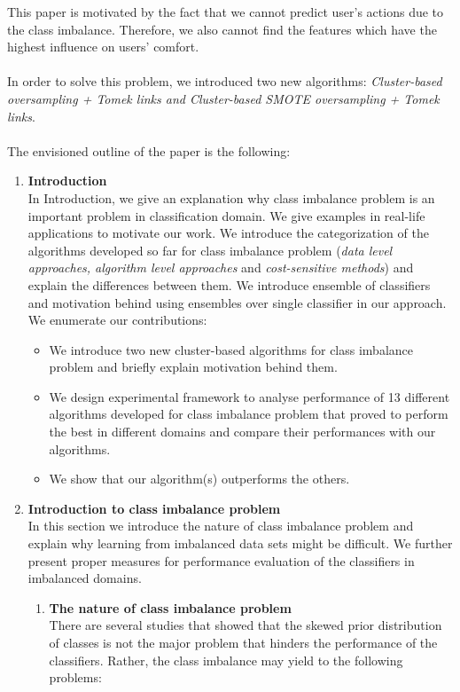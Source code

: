 \documentclass[a4paper]{article}
\begin{document}
This paper is motivated by the fact that we cannot predict user's actions due to the class imbalance. Therefore, we also cannot find the features which have the highest influence on users' comfort. 
\\\\
In order to solve this problem, we introduced two new algorithms: \textit{Cluster-based oversampling + Tomek links and Cluster-based SMOTE oversampling + Tomek links}.
\\\\
The envisioned outline of the paper is the following:
\begin{enumerate}[I]
\item \textbf{Introduction}\\
In Introduction, we give an explanation why class imbalance problem is an important problem in classification domain. We give examples in real-life applications to motivate our work. We introduce the categorization of the algorithms developed so far for class imbalance problem (\textit{data level approaches, algorithm level approaches} and \textit{cost-sensitive methods}) and explain the differences between them. We introduce ensemble of classifiers and motivation behind using ensembles over single classifier in our approach. We enumerate our contributions:
\begin{itemize}
\item We introduce two new cluster-based algorithms for class imbalance problem and briefly explain motivation behind them.
\item We design experimental framework to analyse performance of 13 different algorithms developed for class imbalance problem that proved to perform the best in different domains and compare their performances with our algorithms. 
\item We show that our algorithm(s) outperforms the others. 
\end{itemize}
\item \textbf{Introduction to class imbalance problem}\\
In this section we introduce the nature of  class imbalance problem and explain why learning from imbalanced data sets might be difficult. We further present proper measures for performance evaluation of the classifiers in imbalanced domains. 
	\begin{enumerate}[1.]
	\item \textbf{The nature of class imbalance problem}\\
	There are several studies that showed that the skewed prior distribution of classes is not the major problem that hinders the performance of the classifiers. Rather, the class imbalance may yield to the following problems:

\end{enumerate}
\end{enumerate}
\end{document}
